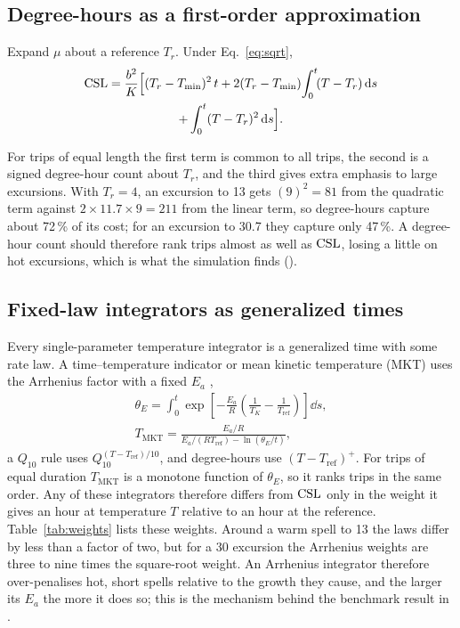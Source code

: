 \subsection{Degree-hours as a first-order approximation}
\begin{corollary}\label{cor:dh}
Expand $\mu$ about a reference $T_r$. Under Eq.~\eqref{eq:sqrt},
\begin{multline}\label{eq:dh}
\mathrm{CSL}=\frac{b^2}{K}\Big[(T_r-T_{\min})^2\,t+2(T_r-T_{\min})\!\int_0^t\!(T-T_r)\,\mathrm{d} s\\+\int_0^t(T-T_r)^2\,\mathrm{d} s\Big].
\end{multline}
\end{corollary}
For trips of equal length the first term is common to all trips, the second is a signed degree-hour count about $T_r$, and the third gives extra emphasis to large excursions. With $T_r=4$\degC, an excursion to 13\degC{} gets $(9)^2=81$ from the quadratic term against $2\times11.7\times9=211$ from the linear term, so degree-hours capture about 72\,\% of its cost; for an excursion to 30.7\degC{} they capture only 47\,\%. A degree-hour count should therefore rank trips almost as well as $\mathrm{CSL}$, losing a little on hot excursions, which is what the simulation finds ().


\subsection{Fixed-law integrators as generalized times}\label{sec:mkt}
Every single-parameter temperature integrator is a generalized time with some rate law. A time--temperature indicator or mean kinetic temperature (MKT) uses the Arrhenius factor with a fixed $E_a$ \cite{taoukis1989,kim2020},
\begin{gather}
\theta_E=\int_0^t\exp\!\left[-\frac{E_a}{R}\left(\frac{1}{T_K}-\frac{1}{T_{\mathrm{ref}}}\right)\right]\dd s,\label{eq:mkt}\\
T_{\mathrm{MKT}}=\frac{E_a/R}{E_a/(RT_{\mathrm{ref}})-\ln(\theta_E/t)},\nonumber
\end{gather}
a $Q_{10}$ rule uses $Q_{10}^{(T-T_{\mathrm{ref}})/10}$, and degree-hours use $(T-T_{\mathrm{ref}})^+$. For trips of equal duration $T_{\mathrm{MKT}}$ is a monotone function of $\theta_E$, so it ranks trips in the same order. Any of these integrators therefore differs from $\mathrm{CSL}$ only in the weight it gives an hour at temperature $T$ relative to an hour at the reference. Table~\ref{tab:weights} lists these weights. Around a warm spell to 13\degC{} the laws differ by less than a factor of two, but for a 30\degC{} excursion the Arrhenius weights are three to nine times the square-root weight. An Arrhenius integrator therefore over-penalises hot, short spells relative to the growth they cause, and the larger its $E_a$ the more it does so; this is the mechanism behind the benchmark result in .

